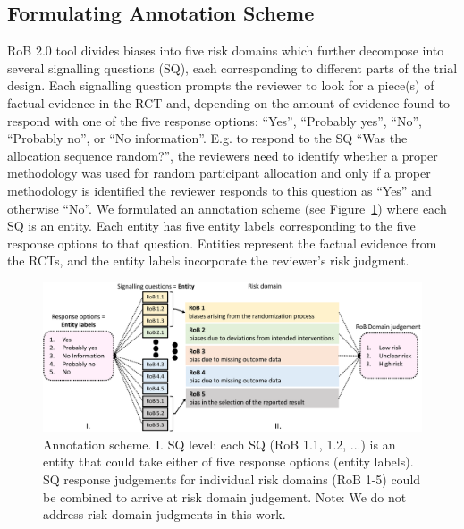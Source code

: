 \documentclass{IOS-Book-Article}
\begin{document}
\subsection{Formulating Annotation Scheme}
%
RoB 2.0 tool divides biases into five risk domains which further decompose into several signalling questions (SQ), each corresponding to different parts of the trial design.
Each signalling question prompts the reviewer to look for a piece(s) of factual evidence in the RCT and, depending on the amount of evidence found to respond with one of the five response options: ``Yes'', ``Probably yes'', ``No'', ``Probably no'', or ``No information''.
E.g. to respond to the SQ ``Was the allocation sequence random?'', the reviewers need to identify whether a proper methodology was used for random participant allocation and only if a proper methodology is identified the reviewer responds to this question as ``Yes'' and otherwise ``No''.
We formulated an annotation scheme (see Figure~\ref{fig:ann_scheme}) where each SQ is an entity.
Each entity has five entity labels corresponding to the five response options to that question.
Entities represent the factual evidence from the RCTs, and the entity labels incorporate the reviewer's risk judgment.
%
\begin{figure}[!htbp]
    \centering
    \includegraphics[width=\textwidth]{Figures/annotation_scheme.pdf}
    \caption{Annotation scheme. I. SQ level: each SQ (RoB 1.1, 1.2, ...) is an entity that could take either of five response options (entity labels). SQ response judgements for individual risk domains (RoB 1-5) could be combined to arrive at risk domain judgement. Note: We do not address risk domain judgments in this work.}
    \label{fig:ann_scheme}
\end{figure}
%
%
%
\end{document}
